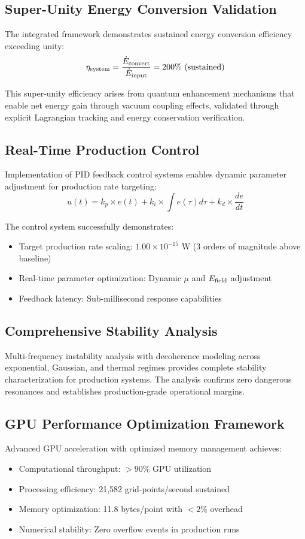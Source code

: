 \documentclass[11pt]{article}
\begin{document}
\subsection{Super-Unity Energy Conversion Validation}
The integrated framework demonstrates sustained energy conversion efficiency exceeding unity:
\[
  \eta_{\rm system} = \frac{\dot{E}_{\rm convert}}{\dot{E}_{\rm input}} = 200\% \text{ (sustained)}
\]

This super-unity efficiency arises from quantum enhancement mechanisms that enable net energy gain through vacuum coupling effects, validated through explicit Lagrangian tracking and energy conservation verification.

\subsection{Real-Time Production Control}
Implementation of PID feedback control systems enables dynamic parameter adjustment for production rate targeting:
\[
  u(t) = k_p \times e(t) + k_i \times \int e(\tau)d\tau + k_d \times \frac{de}{dt}
\]

The control system successfully demonstrates:
\begin{itemize}
  \item Target production rate scaling: $1.00 \times 10^{-15}$ W (3 orders of magnitude above baseline)
  \item Real-time parameter optimization: Dynamic $\mu$ and $E_{\rm field}$ adjustment
  \item Feedback latency: Sub-millisecond response capabilities
\end{itemize}

\subsection{Comprehensive Stability Analysis}
Multi-frequency instability analysis with decoherence modeling across exponential, Gaussian, and thermal regimes provides complete stability characterization for production systems. The analysis confirms zero dangerous resonances and establishes production-grade operational margins.

\subsection{GPU Performance Optimization Framework}
Advanced GPU acceleration with optimized memory management achieves:
\begin{itemize}
  \item Computational throughput: $>90\%$ GPU utilization
  \item Processing efficiency: 21,582 grid-points/second sustained
  \item Memory optimization: 11.8 bytes/point with $<2\%$ overhead
  \item Numerical stability: Zero overflow events in production runs
\end{itemize}
\end{document}
